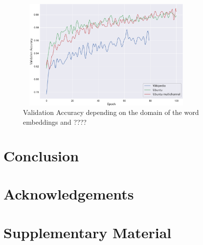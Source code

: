 \documentclass[10pt,twocolumn,letterpaper]{article}
\begin{document}
\begin{figure}[t]
\begin{center}
\includegraphics[width=90mm, height= 55mm, scale=1]{img/embeddings_accuracy.png}
\end{center}
\caption{Validation Accuracy depending on the domain of the word embeddings and ????}
\label{fig:embeddings}
\end{figure}


\section{Conclusion} 



\section*{Acknowledgements}


\appendix
\section{Supplementary Material} 






{\small


}
\end{document}
